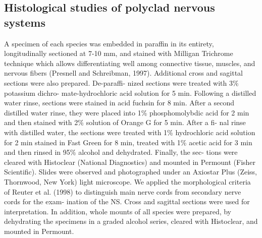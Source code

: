 \begin{multicols}{2}
\subsection*{Histological studies of polyclad nervous systems}

\par{}A specimen of each species was embedded in paraffin
in its entirety, longitudinally sectioned at 7-10 mm, and
stained with Milligan Trichrome technique which allows
differentiating well among connective tissue, muscles, and
nervous fibers (Presnell and Schreibman, 1997). Additional
cross and sagittal sections were also prepared. De-paraffi-
nized sections were treated with 3\% potassium dichro-
mate-hydrochloric acid solution for 5 min. Following a
distilled water rinse, sections were stained in acid fuchsin
for 8 min. After a second distilled water rinse, they were
placed into 1\% phosphomolybdic acid for 2 min and then
stained with 2\% solution of Orange G for 5 min. After a fi-
nal rinse with distilled water, the sections were treated with
1\% hydrochloric acid solution for 2 min stained in Fast
Green for 8 min, treated with 1\% acetic acid for 3 min and
then rinsed in 95\% alcohol and dehydrated. Finally, the sec-
tions were cleared with Histoclear (National Diagnostics)
and mounted in Permount (Fisher Scientific). Slides were
observed and photographed under an Axiostar Plus (Zeiss,
Thornwood, New York) light microscope. We applied the
morphological criteria of Reuter et al. (1998) to distinguish
main nerve cords from secondary nerve cords for the exam-
ination of the NS. Cross and sagittal sections were used for
interpretation. In addition, whole mounts of all species
were prepared, by dehydrating the specimens in a graded
alcohol series, cleared with Histoclear, and mounted in
Permount.

\lipsum



\lipsum


\lipsum
\lipsum


\end{multicols}
